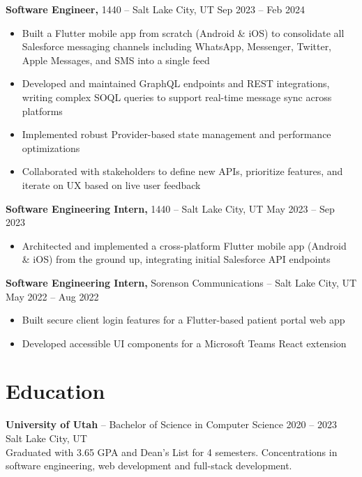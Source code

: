 \documentclass[11pt]{article}       %
\begin{document}
\textbf{Software Engineer,} 1440 -- Salt Lake City, UT \hfill Sep 2023 -- Feb 2024 \\
\vspace{-9pt}
\begin{itemize}
  \item Built a Flutter mobile app from scratch (Android \& iOS) to consolidate all Salesforce messaging channels including WhatsApp, Messenger, Twitter, Apple Messages, and SMS into a single feed
  \item Developed and maintained GraphQL endpoints and REST integrations, writing complex SOQL queries to support real-time message sync across platforms
  \item Implemented robust Provider-based state management and performance optimizations
  \item Collaborated with stakeholders to define new APIs, prioritize features, and iterate on UX based on live user feedback
\end{itemize}

\textbf{Software Engineering Intern,} 1440 -- Salt Lake City, UT \hfill May 2023 -- Sep 2023 \\
\vspace{-9pt}
\begin{itemize}
  \item Architected and implemented a cross-platform Flutter mobile app (Android \& iOS) from the ground up, integrating initial Salesforce API endpoints
\end{itemize}

\textbf{Software Engineering Intern,} Sorenson Communications -- Salt Lake City, UT \hfill May 2022 -- Aug 2022 \\
\vspace{-9pt}
\begin{itemize}
  \item Built secure client login features for a Flutter-based patient portal web app
  \item Developed accessible UI components for a Microsoft Teams React extension
\end{itemize}


\vspace{-18.5pt}

\section*{Education}
\textbf{University of Utah} -- Bachelor of Science in Computer Science \hfill 2020 -- 2023 \\
Salt Lake City, UT \\
Graduated with 3.65 GPA and Dean's List for 4 semesters. Concentrations in software engineering, web development and full-stack development.
\end{document}
